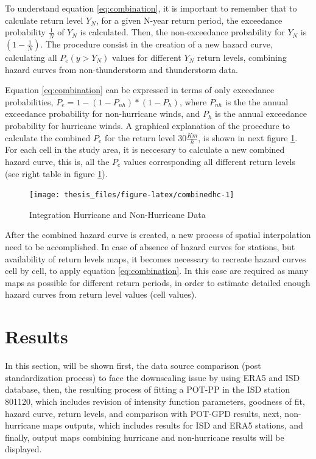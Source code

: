 \documentclass[12pt,oneside]{reedthesis}
\begin{document}
To understand equation \eqref{eq:combination}, it is important to remember that to calculate return level \(Y_N\), for a given N-year return period, the exceedance probability \(\frac{1}{N}\) of \(Y_N\) is calculated. Then, the non-exceedance probability for \(Y_N\) is \(\left(1-\frac{1}{N}\right)\). The procedure consist in the creation of a new hazard curve, calculating all \(P_e(y>Y_N)\) values for different \(Y_N\) return levels, combining hazard curves from non-thunderstorm and thunderstorm data.

Equation \eqref{eq:combination} can be expressed in terms of only exceedance probabilities, \(P_{e} = 1 - (1 -P_{nh}) * (1 - P_{h})\), where \(P_{nh}\) is the the annual exceedance probability for non-hurricane winds, and \(P_{h}\) is the annual exceedance probability for hurricane winds. A graphical explanation of the procedure to calculate the combined \(P_e\) for the return level \(30\frac{Km}{h}\), is shown in next figure \ref{fig:combinedhc}. For each cell in the study area, it is neccesary to calculate a new combined hazard curve, this is, all the \(P_e\) values corresponding all different return levels (see right table in figure \ref{fig:combinedhc}).
\begin{figure}

{\centering \texttt{[image: thesis\_files/figure-latex/combinedhc-1]} 

}

\caption{Integration Hurricane and Non-Hurricane Data}\label{fig:combinedhc}
\end{figure}
After the combined hazard curve is created, a new process of spatial interpolation need to be accomplished. In case of absence of hazard curves for stations, but availability of return levels maps, it becomes necessary to recreate hazard curves cell by cell, to apply equation \eqref{eq:combination}. In this case are required as many maps as possible for different return periods, in order to estimate detailed enough hazard curves from return level values (cell values).

\hypertarget{rmd-results}{%
\chapter{Results}\label{rmd-results}}

In this section, will be shown first, the data source comparison (post standardization process) to face the downscaling issue by using ERA5 and ISD database, then, the resulting process of fitting a POT-PP in the ISD station 801120, which includes revision of intensity function parameters, goodness of fit, hazard curve, return levels, and comparison with POT-GPD results, next, non-hurricane maps outputs, which includes results for ISD and ERA5 stations, and finally, output maps combining hurricane and non-hurricane results will be displayed.
\end{document}
